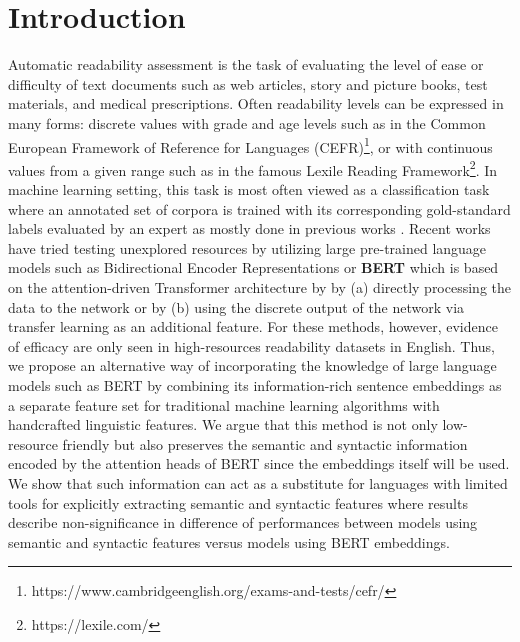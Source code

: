 \documentclass[11pt,a4paper]{article}
\begin{document}
\section{Introduction}
Automatic readability assessment is the task of evaluating the level of ease or difficulty of text documents such as web articles, story and picture books, test materials, and medical prescriptions. Often readability levels can be expressed in many forms: discrete values with grade and age levels such as in the Common European Framework of Reference for Languages (CEFR)\footnote{https://www.cambridgeenglish.org/exams-and-tests/cefr/}, or with continuous values from a given range such as in the famous Lexile Reading Framework\footnote{https://lexile.com/}. In machine learning setting, this task is most often viewed as a classification task where an annotated set of corpora is trained with its corresponding gold-standard labels evaluated by an expert as mostly done in previous works \cite{vajjalatrends,chatzipanagiotidis-etal-2021-broad,weiss-meurers-2018-modeling,xia-etal-2016-text,reynolds-2016-insights,hancke-etal-2012-readability,vajjala-meurers-2012-improving}. Recent works have tried testing unexplored resources by utilizing large pre-trained language models such as Bidirectional Encoder Representations or \textbf{BERT} \cite{devlin-etal-2019-bert} which is based on the attention-driven Transformer architecture by \citet{vaswani-et-al} by (a) directly processing the data to the network \cite{martinc2021supervised,tseng2019innovative} or by (b) using the discrete output of the network via transfer learning \cite{deutsch-etal-2020-linguistic} as an additional feature. For these methods, however, evidence of efficacy are only seen in high-resources readability datasets in English. Thus, we propose an alternative way of incorporating the knowledge of large language models such as BERT by combining its information-rich sentence embeddings as a separate feature set for traditional machine learning algorithms with handcrafted linguistic features. We argue that this method is not only low-resource friendly but also preserves the semantic and syntactic information encoded by the attention heads of BERT since the embeddings itself will be used. We show that such information can act as a substitute for languages with limited tools for explicitly extracting semantic and syntactic features where results describe non-significance in difference of performances between models using semantic and syntactic features versus models using BERT embeddings.
\end{document}
